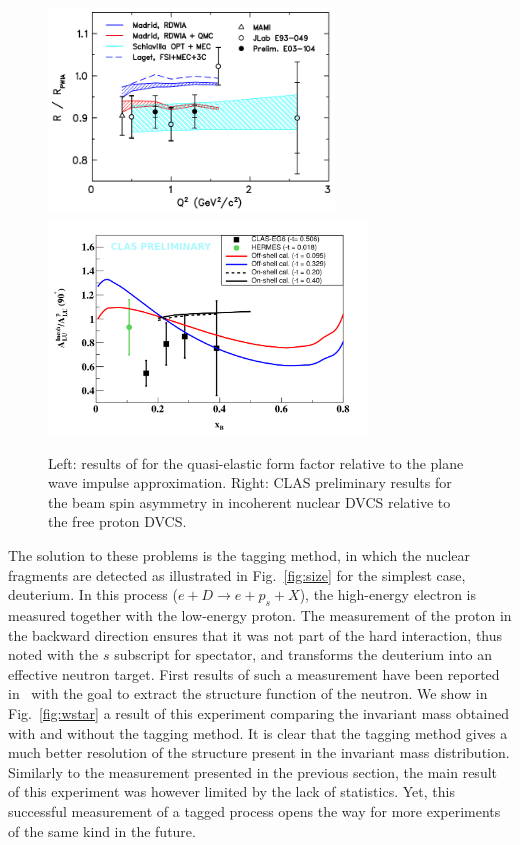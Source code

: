 \begin{figure}[tbp!]
\center
\includegraphics[width=7.6cm]{plots/ModifiedFF.png}
\includegraphics[width=8.5cm]{plots/ALU_ratioInc_x_shortscenrario.png}
\caption{Left: results of \cite{Strauch:2002wu} for the quasi-elastic form factor relative to
the plane wave impulse approximation. Right: CLAS preliminary results 
for the beam spin asymmetry in incoherent nuclear DVCS relative to the free proton DVCS.}
\label{fig:QEincoh}
\end{figure}

The solution to these problems is the tagging method, in which the nuclear fragments
are detected as illustrated in Fig.~\ref{fig:size} for the simplest case, deuterium.
In this process ($e+D \rightarrow e+p_s+X$), the high-energy electron is measured
together with the low-energy proton. The measurement of the proton in the backward 
direction ensures that it was not part of the hard interaction, thus noted with 
the $s$ subscript for spectator, and transforms the deuterium into 
an effective neutron target. First results of such a measurement
have been reported in~\cite{Baillie:2011za} with the goal to extract the structure
function of the neutron. We show in Fig.~\ref{fig:wstar} a result of this experiment
comparing the invariant mass obtained with and without the tagging method. It is 
clear that the tagging method gives a much better resolution of the structure 
present in the invariant mass distribution. Similarly to the measurement presented in 
the previous section, the main result of this experiment was however limited by the lack
of statistics. Yet, this successful measurement of a tagged process opens the way for more
experiments of the same kind in the future. 

